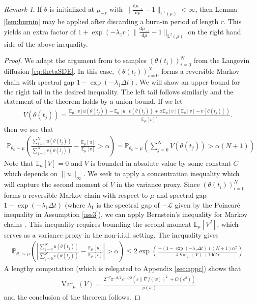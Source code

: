 \documentclass[11pt]{article}
\theoremstyle{plain}
\theoremstyle{definition}
\theoremstyle{remark}
\newtheorem{remark}[theorem]{Remark}
\numberwithin{equation}{section}
\renewcommand{\L}{\mathscr{L}}
\renewcommand{\d}{\mathrm{d}}
\newcommand{\lb}{\left}
\newcommand{\rb}{\right}
\newcommand{\veps}{\varepsilon}
\newcommand{\bP}{\mathbb{P}}
\newcommand{\bL}{\mathbb{L}}
\newcommand{\E}{\mathbb{E}}
\newcommand{\Var}{\operatorname{Var}}
\begin{document}
\begin{remark}
If $\theta$ is initialized at $\mu_{-r}$ with $\|\frac{\d\mu_{-r}}{\d\mu}-1\|_{\bL^2(\mu)}<\infty$, then Lemma \ref{lem:burnin} may be applied after discarding a burn-in period of length $r$. This yields an extra factor of $1+\exp\lb(-\lambda_1 r\rb)\|\frac{\d\mu_{-r}}{\d\mu}-1\|_{\bL^2(\mu)}$ on the right hand side of the above inequality.
\end{remark}

\begin{proof}
We adapt the argument from \citet[Section 3]{singer_graph_2006} to samples $(\theta(t_i))_{i=0}^N$ from the Langevin diffusion \eqref{eq:thetaSDE}. In this case, $(\theta(t_i))_{i=0}^N$ forms a reversible Markov chain with spectral gap $1-\exp(-\lambda_1 \Delta t)$. We will show an upper bound for the right tail in the desired inequality. The left tail follows similarly and the statement of the theorem holds by a union bound. If we let
\begin{align*}
V(\theta(t_j))=\frac{\E_{\mu} [v]u(\theta(t_j))-\E_{\mu} [u]v(\theta(t_j))+\alpha \E_{\mu} [v](\E_{\mu} [v]-v(\theta(t_j)))}{\E_{\mu} [v]^2}.
\end{align*}
then we see that
\begin{align*}
\bP_{\theta_0\sim \mu}\lb(\frac{\sum_{j=0}^N u(\theta(t_j))}{\sum_{j=0}^Nv(\theta(t_j))}  -\frac{\E_{\mu} [u]}{\E_{\mu} [v]}>\alpha \rb)=\bP_{\theta_0\sim \mu}\lb(\sum_{j=0}^N V(\theta(t_j))>\alpha(N+1)\rb)
\end{align*}
Note that $\E_{\mu}[V]=0$ and $V$ is bounded in absolute value by some constant $C$ which depends on $\|u\|_\infty$. We seek to apply a concentration inequality which will capture the second moment of $V$ in the variance proxy. Since $(\theta(t_i))_{i=0}^N$ forms a reversible Markov chain with respect to $\mu$ and spectral gap $1-\exp(-\lambda_1 \Delta t)$ (where $\lambda_1$ is the spectral gap of $-\L$ given by the Poincaré inequality in Assumption \ref{ass3}), we can apply Bernstein's inequality for Markov chains \citep[Theorem 3.3]{paulin_concentration_2015}. This inequality requires bounding the second moment $\mathbb{E}_\mu[V^2]$, which serves as a variance proxy in the non-i.i.d. setting. The inequality  gives
\begin{align*}
\bP_{\theta_0\sim \mu}\lb(\lb|\frac{\sum_{j=0}^N u(\theta(t_j))}{\sum_{j=0}^Nv(\theta(t_j))} -\frac{\E_{\mu} [u]}{\E_{\mu} [v]}\rb|>\alpha \rb)\le 2\exp\lb(\frac{-(1-\exp(-\lambda_1 \Delta t))(N+1) \alpha^2}{4\Var_{\mu}(V)+10 C \alpha}\rb)
\end{align*}
A lengthy computation (which is relegated to Appendix \ref{sec:appc}) shows that
\begin{align*}
\Var_{\mu}(V)=\frac{2^{-d} \pi^{-d/2} \veps^{-d/2}\lb(\veps\|\nabla f(w)\|^2+O(\veps^2)\rb)}{p(w)}
\end{align*}
and the conclusion of the theorem follows. \qedhere
\end{proof}
\end{document}
